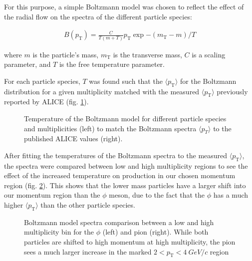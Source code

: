 \documentclass[ALICE,manyauthors]{ALICE_analysis_notes}
\begin{document}
For this purpose, a simple Boltzmann model was chosen to reflect the effect of the radial flow on the spectra of the different particle species:

\begin{align}
    B(p_{\text{T}}) = \frac{C}{T(m+T)}p_{\text{T}}\exp{-(m_{\text{T}}-m)/T}
\end{align}

where $m$ is the particle's mass, $m_{\text{T}}$ is the transverse mass, $C$ is a scaling parameter, and $T$ is the free temperature parameter.

For each particle species, $T$ was found such that the $\langle p_{\text{T}}\rangle$ for the Boltzmann distribution for a given multiplicity matched with the measured $\langle p_{\text{T}}\rangle$ previously reported by ALICE (fig. \ref{mean_pt}).

\begin{figure}[ht]
\centering
\begin{subfigure}{
\texttt{[image: images/addendum/boltz/boltz\_temp.png]}
}
\end{subfigure}
\begin{subfigure}{
\texttt{[image: images/addendum/boltz/pub\_meanpt.png]}
}
\end{subfigure}
\caption{Temperature of the Boltzmann model for different particle species and multiplicities (left) to match the Boltzmann spectra $\langle p_{T}\rangle$ to the published ALICE values (right).}
\label{mean_pt}
\end{figure}

After fitting the temperatures of the Boltzmann spectra to the measured $\langle p_{\text{T}} \rangle$, the spectra were compared between low and high multiplicity regions to see the effect of the increased temperature on production in our chosen momentum region (fig. \ref{boltzspectra}).  This shows that the lower mass particles have a larger shift into our momentum region than the $\phi$ meson, due to the fact that the $\phi$ has a much higher $\langle p_{\text{T}} \rangle$ than the other particle species.

\begin{figure}[ht]
\centering
\begin{subfigure}{
\texttt{[image: images/addendum/boltz/boltz\_phispectra.png]}
}
\end{subfigure}
\begin{subfigure}{
\texttt{[image: images/addendum/boltz/boltz\_pispectra.png]}
}
\end{subfigure}
\caption{Boltzmann model spectra comparison between a low and high multiplicity bin for the $\phi$ (left) and pion (right). While both particles are shifted to high momentum at high multiplicity, the pion sees a much larger increase in the marked $2 < p_{\text{T}} < \SI{4}{GeV/c}$ region}
\label{boltzspectra}
\end{figure}
\end{document}

